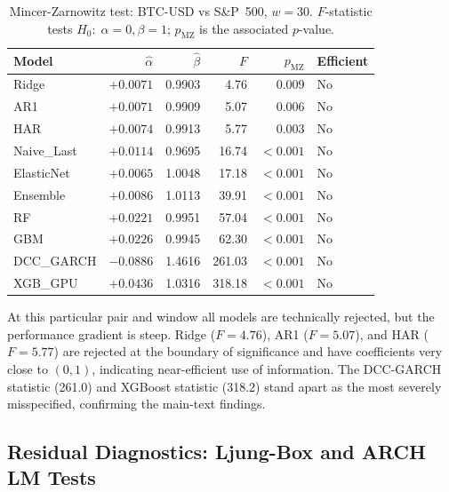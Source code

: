 \begin{table}[H]
    \centering
    \caption{Mincer-Zarnowitz test: BTC-USD vs S\&P~500, $w = 30$.
             $F$-statistic tests $H_0{:}\;\alpha=0, \beta=1$; $p_\text{MZ}$ is
             the associated $p$-value.}
    \label{tab:mz_gspc_w30}
    \begin{tabular}{lrrrrl}
        \toprule
        Model & $\hat{\alpha}$ & $\hat{\beta}$ & $F$ & $p_\text{MZ}$ & Efficient \\
        \midrule
        Ridge       & $+0.0071$ & 0.9903 &   4.76 & 0.009 & No  \\
        AR1         & $+0.0071$ & 0.9909 &   5.07 & 0.006 & No  \\
        HAR         & $+0.0074$ & 0.9913 &   5.77 & 0.003 & No  \\
        Naive\_Last & $+0.0114$ & 0.9695 &  16.74 & $<0.001$ & No  \\
        ElasticNet  & $+0.0065$ & 1.0048 &  17.18 & $<0.001$ & No  \\
        Ensemble    & $+0.0086$ & 1.0113 &  39.91 & $<0.001$ & No  \\
        RF          & $+0.0221$ & 0.9951 &  57.04 & $<0.001$ & No  \\
        GBM         & $+0.0226$ & 0.9945 &  62.30 & $<0.001$ & No  \\
        DCC\_GARCH  & $-0.0886$ & 1.4616 & 261.03 & $<0.001$ & No  \\
        XGB\_GPU    & $+0.0436$ & 1.0316 & 318.18 & $<0.001$ & No  \\
        \bottomrule
    \end{tabular}
\end{table}

At this particular pair and window all models are technically rejected, but the
performance gradient is steep. Ridge ($F = 4.76$), AR1 ($F = 5.07$), and HAR
($F = 5.77$) are rejected at the boundary of significance and have coefficients
very close to $(0, 1)$, indicating near-efficient use of information. The
DCC-GARCH statistic (261.0) and XGBoost statistic (318.2) stand apart as the
most severely misspecified, confirming the main-text findings.

\subsection{Residual Diagnostics: Ljung-Box and ARCH LM Tests}

